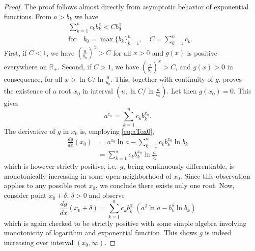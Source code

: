 \documentclass[reqno]{amsart}
\theoremstyle{plain}
\theoremstyle{note}
\newcommand{\reals}{\mathbb{R}}
\begin{document}
\begin{proof}
The proof follows almost directly from asymptotic behavior of exponential functions. From $a > b_k$ we have
\begin{align}
    &\sum_{k=1}^{n} c_k b_{k}^{x} < C b_{0}^{x} \\
    &\text{for}\quad b_0 = \max{\{b_k\}_{k=1}^{n}}, \quad C = \sum_{k=1}^{n} c_k .\nonumber
\end{align}
First, if $C < 1$, we have $\left(\frac{a}{b_0}\right)^x > C$ for all $x > 0$ and $g(x)$ is positive everywhere on $\reals_+$. Second, if $C > 1$, we have $\left(\frac{a}{b_0}\right)^x > C$, and $g(x) > 0$ in consequence, for all $x > \ln{C} / \ln{\frac{a}{b_0}}$. This, together with continuity of $g$, proves the existence of a root $x_0$ in interval $(u, \ln{C} / \ln{\frac{a}{b_0}})$. Let then $g(x_0) = 0$. This gives
\begin{equation}\label{eq:aTox0}
    a^{x_0} = \sum_{k=1}^{n} c_k b_{k}^{x_0} .
\end{equation}
The derivative of $g$ in $x_0$ is, employing \eqref{eq:aTox0},
\begin{align}
    \frac{dg}{dx}(x_0) &= a^{x_{0}} \ln{a} - \sum_{k=1}^{n} c_k b_{k}^{x_0} \ln{b_k} \\
    &= \sum_{k=1}^{n} c_k b_{k}^{x_0} \ln{\frac{a}{b_k}}\nonumber
\end{align}
which is however strictly positive, i.e.~$g$, being continuously differentiable, is monotonically increasing in some open neighborhood of $x_0$. Since this observation applies to any possible root $x_0$, we conclude there exists only one root. Now, consider point $x_0 + \delta$, $\delta > 0$ and observe
\begin{equation}
    \frac{dg}{dx}(x_0 + \delta) = \sum_{k=1}^{n} c_k b_{k}^{x_0} \left( a^\delta \ln{a} - b_{k}^{\delta}\ln{b_k} \right)
\end{equation}
which is again checked to be strictly positive with some simple algebra involving monotonicity of logarithm and exponential function. This shows $g$ is indeed increasing over interval $(x_0, \infty)$.
\end{proof}
\end{document}
